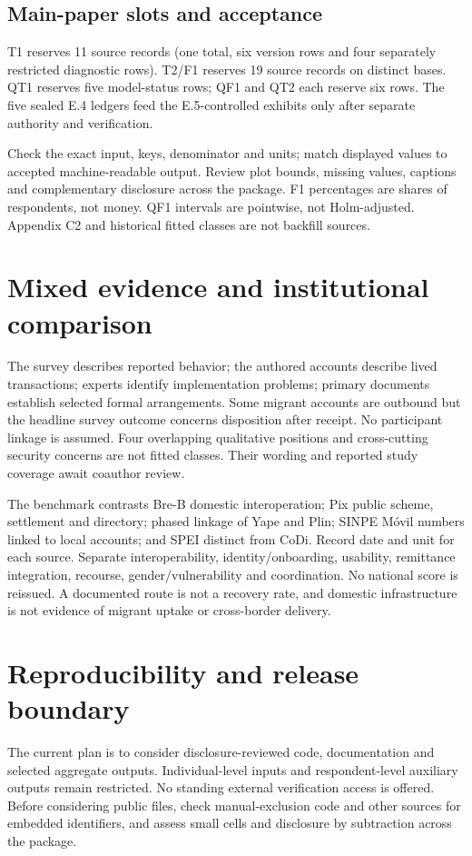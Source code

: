\documentclass[12pt]{article}
\begin{document}
\subsection*{Main-paper slots and acceptance}
T1 reserves 11 source records (one total, six version rows and four separately restricted diagnostic rows). T2/F1 reserves 19 source records on distinct bases. QT1 reserves five model-status rows; QF1 and QT2 each reserve six rows. The five sealed E.4 ledgers feed the E.5-controlled exhibits only after separate authority and verification.

Check the exact input, keys, denominator and units; match displayed values to accepted machine-readable output. Review plot bounds, missing values, captions and complementary disclosure across the package. F1 percentages are shares of respondents, not money. QF1 intervals are pointwise, not Holm-adjusted. Appendix C2 and historical fitted classes are not backfill sources.

\section{Mixed evidence and institutional comparison}
The survey describes reported behavior; the authored accounts describe lived transactions; experts identify implementation problems; primary documents establish selected formal arrangements. Some migrant accounts are outbound but the headline survey outcome concerns disposition after receipt. No participant linkage is assumed. Four overlapping qualitative positions and cross-cutting security concerns are not fitted classes. Their wording and reported study coverage await coauthor review.

The benchmark contrasts Bre-B domestic interoperation; Pix public scheme, settlement and directory; phased linkage of Yape and Plin; SINPE Móvil numbers linked to local accounts; and SPEI distinct from CoDi. Record date and unit for each source. Separate interoperability, identity/onboarding, usability, remittance integration, recourse, gender/vulnerability and coordination. No national score is reissued. A documented route is not a recovery rate, and domestic infrastructure is not evidence of migrant uptake or cross-border delivery.

\section{Reproducibility and release boundary}
The current plan is to consider disclosure-reviewed code, documentation and selected aggregate outputs. Individual-level inputs and respondent-level auxiliary outputs remain restricted. No standing external verification access is offered. Before considering public files, check manual-exclusion code and other sources for embedded identifiers, and assess small cells and disclosure by subtraction across the package.
\end{document}
